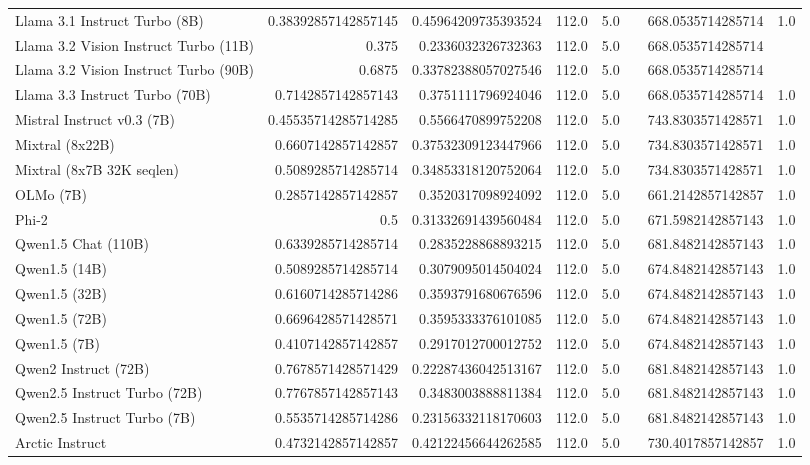 \begin{table}[htp]
{\begin{tabular}{lrrrrrrr}
Llama 3.1 Instruct Turbo (8B) & 0.38392857142857145 & 0.45964209735393524 & 112.0 & 5.0 &  & 668.0535714285714 & 1.0 \\
Llama 3.2 Vision Instruct Turbo (11B) & 0.375 & 0.2336032326732363 & 112.0 & 5.0 &  & 668.0535714285714 &  \\
Llama 3.2 Vision Instruct Turbo (90B) & 0.6875 & 0.33782388057027546 & 112.0 & 5.0 &  & 668.0535714285714 &  \\
Llama 3.3 Instruct Turbo (70B) & 0.7142857142857143 & 0.3751111796924046 & 112.0 & 5.0 &  & 668.0535714285714 & 1.0 \\
Mistral Instruct v0.3 (7B) & 0.45535714285714285 & 0.5566470899752208 & 112.0 & 5.0 &  & 743.8303571428571 & 1.0 \\
Mixtral (8x22B) & 0.6607142857142857 & 0.37532309123447966 & 112.0 & 5.0 &  & 734.8303571428571 & 1.0 \\
Mixtral (8x7B 32K seqlen) & 0.5089285714285714 & 0.34853318120752064 & 112.0 & 5.0 &  & 734.8303571428571 & 1.0 \\
OLMo (7B) & 0.2857142857142857 & 0.3520317098924092 & 112.0 & 5.0 &  & 661.2142857142857 & 1.0 \\
Phi-2 & 0.5 & 0.31332691439560484 & 112.0 & 5.0 &  & 671.5982142857143 & 1.0 \\
Qwen1.5 Chat (110B) & 0.6339285714285714 & 0.2835228868893215 & 112.0 & 5.0 &  & 681.8482142857143 & 1.0 \\
Qwen1.5 (14B) & 0.5089285714285714 & 0.3079095014504024 & 112.0 & 5.0 &  & 674.8482142857143 & 1.0 \\
Qwen1.5 (32B) & 0.6160714285714286 & 0.3593791680676596 & 112.0 & 5.0 &  & 674.8482142857143 & 1.0 \\
Qwen1.5 (72B) & 0.6696428571428571 & 0.3595333376101085 & 112.0 & 5.0 &  & 674.8482142857143 & 1.0 \\
Qwen1.5 (7B) & 0.4107142857142857 & 0.2917012700012752 & 112.0 & 5.0 &  & 674.8482142857143 & 1.0 \\
Qwen2 Instruct (72B) & 0.7678571428571429 & 0.22287436042513167 & 112.0 & 5.0 &  & 681.8482142857143 & 1.0 \\
Qwen2.5 Instruct Turbo (72B) & 0.7767857142857143 & 0.3483003888811384 & 112.0 & 5.0 &  & 681.8482142857143 & 1.0 \\
Qwen2.5 Instruct Turbo (7B) & 0.5535714285714286 & 0.23156332118170603 & 112.0 & 5.0 &  & 681.8482142857143 & 1.0 \\
Arctic Instruct & 0.4732142857142857 & 0.42122456644262585 & 112.0 & 5.0 &  & 730.4017857142857 & 1.0 \\

\end{tabular}}
\end{table}
